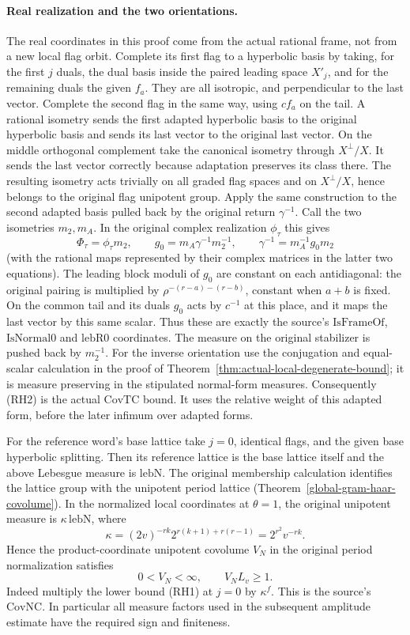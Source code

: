 \paragraph{Real realization and the two orientations.}
The real coordinates in this proof come from the actual
rational frame, not from a new local flag orbit. Complete its
first flag to a hyperbolic basis by taking, for the first \(j\)
duals, the dual basis inside the paired leading space \(X'_j\),
and for the remaining duals the given \(f_a\). They are all
isotropic, and perpendicular to the last vector. Complete the
second flag in the same way, using \(c f_a\) on the tail.
A rational isometry sends the first adapted hyperbolic basis
to the original hyperbolic basis and sends its last vector
to the original last vector. On the middle orthogonal
complement take the canonical isometry through \(X^\perp/X\).
It sends the last vector correctly because adaptation preserves
its class there. The resulting isometry acts trivially on all
graded flag spaces and on \(X^\perp/X\), hence belongs to the
original flag unipotent group. Apply the same construction
to the second adapted basis pulled back by the original
return \(\gamma^{-1}\). Call the two isometries \(m_2,m_A\).
In the original complex realization \(\phi_\tau\) this gives
\[
 \Phi_\tau=\phi_\tau m_2,\qquad
 g_0=m_A\gamma^{-1}m_2^{-1},\qquad
 \gamma^{-1}=m_A^{-1}g_0m_2
\]
(with the rational maps represented by their complex matrices
in the latter two equations). The leading block moduli of
\(g_0\) are constant on each antidiagonal: the original
pairing is multiplied by
\(\rho^{-(r-a)-(r-b)}\), constant when \(a+b\) is fixed.
On the common tail and its duals \(g_0\) acts by \(c^{-1}\)
at this place, and it maps the last vector by this same scalar.
Thus these are exactly the source's \(\mathrm{IsFrameOf}\),
\(\mathrm{IsNormal0}\) and \(\mathrm{lebR0}\) coordinates.
The measure on the original stabilizer is pushed back by
\(m_2^{-1}\). For the inverse orientation use the conjugation
and equal-scalar calculation in the proof of
Theorem~\ref{thm:actual-local-degenerate-bound}; it is measure
preserving in the stipulated normal-form measures. Consequently
(RH2) is the actual \(\mathrm{CovTC}\) bound. It uses the
relative weight of this adapted form, before the later
infimum over adapted forms.

For the reference word's base lattice take \(j=0\), identical
flags, and the given base hyperbolic splitting. Then its
reference lattice is the base lattice itself and the above
Lebesgue measure is \(\mathrm{lebN}\). The original membership
calculation identifies the lattice group with the unipotent
period lattice (Theorem~\ref{global-gram-haar-covolume}).
In the normalized local coordinates at \(\theta=1\), the
original unipotent measure is \(\kappa\,\mathrm{lebN}\), where
\[
 \kappa=(2v)^{-rk}2^{r(k+1)+r(r-1)}
        =2^{r^2}v^{-rk}.
\]
Hence the product-coordinate unipotent covolume \(V_N\)
in the original period normalization satisfies
\[
             0<V_N<\infty,\qquad V_N L_v\ge1 .
 \tag{RH3}
\]
Indeed multiply the lower bound (RH1) at \(j=0\) by
\(\kappa^f\). This is the source's \(\mathrm{CovNC}\).
In particular all measure factors used in the subsequent
amplitude estimate have the required sign and finiteness.
